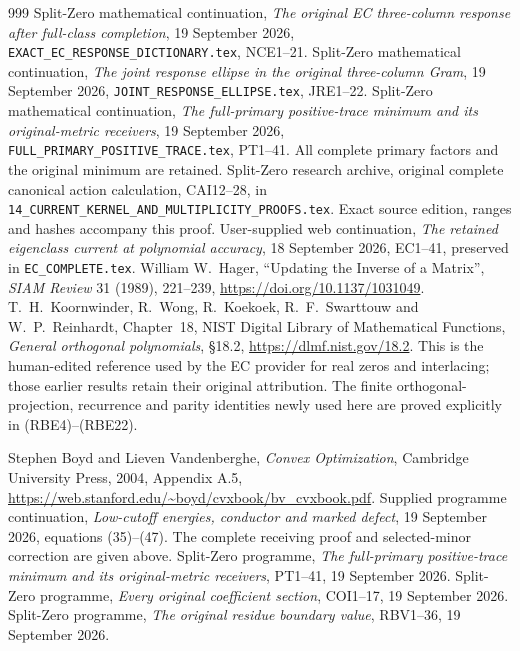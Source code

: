 \begin{thebibliography}{999}
 Split-Zero mathematical continuation,
\emph{The original EC three-column response after full-class completion},
19 September 2026, \texttt{EXACT\_EC\_RESPONSE\_DICTIONARY.tex}, NCE1--21.
 Split-Zero mathematical continuation,
\emph{The joint response ellipse in the original three-column Gram},
19 September 2026, \texttt{JOINT\_RESPONSE\_ELLIPSE.tex}, JRE1--22.
 Split-Zero mathematical continuation,
\emph{The full-primary positive-trace minimum and its original-metric
receivers}, 19 September 2026, \texttt{FULL\_PRIMARY\_POSITIVE\_TRACE.tex},
PT1--41. All complete primary factors and the original minimum are retained.
 Split-Zero research archive, original complete canonical
action calculation, CAI12--28, in
\texttt{14\_CURRENT\_KERNEL\_AND\_MULTIPLICITY\_PROOFS.tex}.
Exact source edition, ranges and hashes accompany this proof.
 User-supplied web continuation,
\emph{The retained eigenclass current at polynomial accuracy},
18 September 2026, EC1--41, preserved in \texttt{EC\_COMPLETE.tex}.
 William W.~Hager, ``Updating the Inverse of a Matrix'',
\emph{SIAM Review} 31 (1989), 221--239,
\url{https://doi.org/10.1137/1031049}.
 T.~H.~Koornwinder, R.~Wong, R.~Koekoek,
R.~F.~Swarttouw and W.~P.~Reinhardt, Chapter~18,
NIST Digital Library of Mathematical Functions,
\emph{General orthogonal polynomials}, \S18.2,
\url{https://dlmf.nist.gov/18.2}. This is the human-edited reference
used by the EC provider for real zeros and interlacing; those earlier
results retain their original attribution. The finite orthogonal-
projection, recurrence and parity identities newly used here are
proved explicitly in (RBE4)--(RBE22).

 Stephen Boyd and Lieven Vandenberghe,
\emph{Convex Optimization}, Cambridge University Press, 2004,
Appendix A.5,
\url{https://web.stanford.edu/~boyd/cvxbook/bv_cvxbook.pdf}.
 Supplied programme continuation,
\emph{Low-cutoff energies, conductor and marked defect},
19 September 2026, equations (35)--(47).
The complete receiving proof and selected-minor correction
are given above.
 Split-Zero programme,
\emph{The full-primary positive-trace minimum and its original-metric
receivers}, PT1--41, 19 September 2026.
 Split-Zero programme,
\emph{Every original coefficient section}, COI1--17,
19 September 2026.
 Split-Zero programme,
\emph{The original residue boundary value}, RBV1--36,
19 September 2026.

\end{thebibliography}
